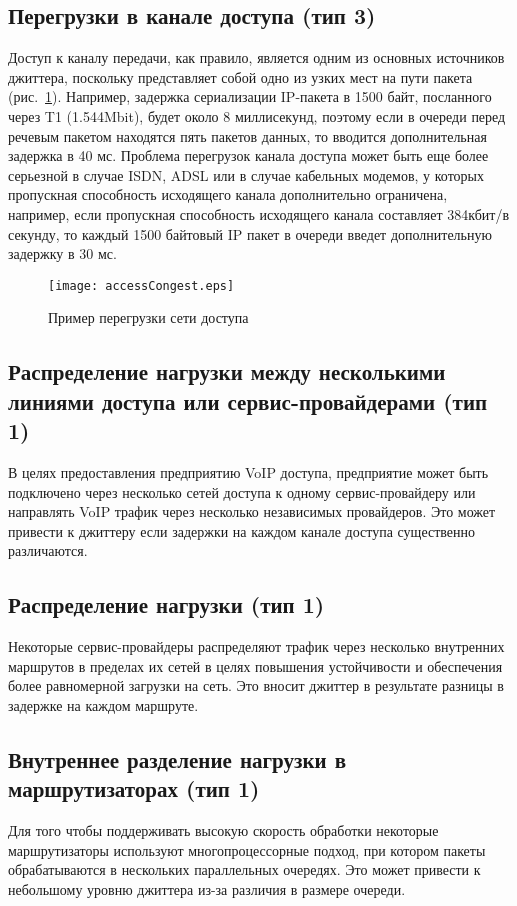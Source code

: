 \subsection{Перегрузки в канале доступа (тип 3) } \label{subsect2_1_3}
Доступ к каналу передачи, как правило, является одним из основных источников джиттера, поскольку представляет собой одно из узких мест на пути пакета (рис. \ref{img:accessCongest}). Например, задержка сериализации IP-пакета в 1500 байт, посланного через T1 (1.544Mbit), будет около 8 миллисекунд, поэтому если в очереди перед речевым пакетом находятся пять пакетов данных, то вводится дополнительная задержка в 40 мс. Проблема перегрузок канала доступа может быть еще более серьезной в случае ISDN, ADSL или в случае кабельных модемов, у которых пропускная способность исходящего канала дополнительно ограничена, например, если пропускная способность исходящего канала составляет 384кбит/в секунду, то каждый 1500 байтовый IP пакет в очереди введет дополнительную задержку в 30 мс.

\begin{figure} [!h]
  \center
\texttt{[image: accessCongest.eps]}
  \caption{Пример перегрузки сети доступа \cite{clark}}
  \label{img:accessCongest}
\end{figure}

\subsection{Распределение нагрузки между несколькими линиями доступа или сервис-провайдерами (тип 1) } \label{subsect2_1_4}
В целях предоставления предприятию VoIP доступа, предприятие может быть подключено через несколько сетей доступа к одному сервис-провайдеру или направлять VoIP трафик через несколько независимых провайдеров. Это может привести к джиттеру если задержки на каждом канале доступа существенно различаются.

\subsection{Распределение нагрузки (тип 1) } \label{subsect2_1_5}
Некоторые сервис-провайдеры распределяют трафик через несколько внутренних маршрутов в пределах их сетей в целях повышения устойчивости и обеспечения более равномерной загрузки на сеть. Это вносит джиттер в результате разницы в задержке на каждом маршруте.

\subsection{Внутреннее разделение нагрузки в маршрутизаторах (тип 1) } \label{subsect2_1_6}
Для того чтобы поддерживать высокую скорость обработки некоторые маршрутизаторы используют многопроцессорные подход, при котором пакеты обрабатываются в нескольких параллельных очередях. Это может привести к небольшому уровню джиттера из-за различия в размере очереди.

